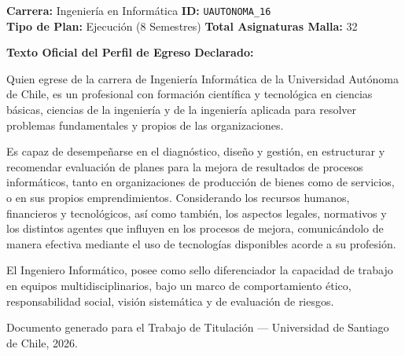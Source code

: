\documentclass[11pt,a4paper]{article}
\begin{document}
\begin{tcolorbox}[fichaStyle, title={UNIVERSIDAD 16: Universidad Autónoma de Chile (UAUTONOMA)}]
\small\sffamily
\textbf{Carrera:} Ingeniería en Informática \hfill \textbf{ID:} \texttt{UAUTONOMA\_16} \\
\textbf{Tipo de Plan:} Ejecución (8 Semestres) \hfill \textbf{Total Asignaturas Malla:} 32

\tcbline

\textbf{Texto Oficial del Perfil de Egreso Declarado:}\\[4pt]
{\small\rmfamily
Quien egrese de la carrera de Ingeniería Informática de la Universidad Autónoma de Chile, es un profesional con formación científica y tecnológica en ciencias básicas, ciencias de la ingeniería y de la ingeniería aplicada para resolver problemas fundamentales y propios de las organizaciones.

\vspace{4pt}
Es capaz de desempeñarse en el diagnóstico, diseño y gestión, en estructurar y recomendar evaluación de planes para la mejora de resultados de procesos informáticos, tanto en organizaciones de producción de bienes como de servicios, o en sus propios emprendimientos. Considerando los recursos humanos, financieros y tecnológicos, así como también, los aspectos legales, normativos y los distintos agentes que influyen en los procesos de mejora, comunicándolo de manera efectiva mediante el uso de tecnologías disponibles acorde a su profesión.

\vspace{4pt}
El Ingeniero Informático, posee como sello diferenciador la capacidad de trabajo en equipos multidisciplinarios, bajo un marco de comportamiento ético, responsabilidad social, visión sistemática y de evaluación de riesgos.
}
\end{tcolorbox}

\vfill
\begin{center}
    \small\sffamily\color{gray!80}
    Documento generado para el Trabajo de Titulación --- Universidad de Santiago de Chile, 2026.
\end{center}
\end{document}
